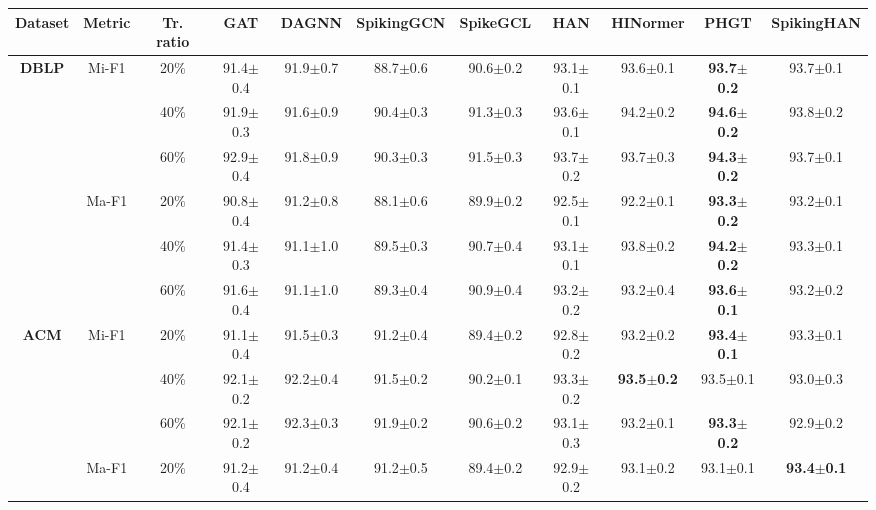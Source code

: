 \documentclass[letterpaper]{article} %
\begin{document}
\begin{table}[t]
\centering
\small
\renewcommand{\arraystretch}{1.3}
\setlength{\tabcolsep}{4pt}
\begin{tabular}{c|c|c|ccccccc|c}
\toprule
\textbf{Dataset} & \textbf{Metric} & \textbf{Tr. ratio} & \textbf{GAT} & \textbf{DAGNN} & \textbf{SpikingGCN} & \textbf{SpikeGCL} & \textbf{HAN} & \textbf{HINormer} & \textbf{PHGT} & \textbf{SpikingHAN} \\
\midrule
\multirow{6}{*}{\textbf{DBLP}} 
 & \multirow{3}{*}{Mi-F1} & 20\% & 91.4$\pm$0.4 & 91.9$\pm$0.7 & 88.7$\pm$0.6 & 90.6$\pm$0.2 & 93.1$\pm$0.1 & 93.6$\pm$0.1 & \textbf{93.7$\pm$0.2} & 93.7$\pm$0.1 \\
 &                        & 40\% & 91.9$\pm$0.3 & 91.6$\pm$0.9 & 90.4$\pm$0.3 & 91.3$\pm$0.3 & 93.6$\pm$0.1 & 94.2$\pm$0.2 & \textbf{94.6$\pm$0.2} & 93.8$\pm$0.2 \\
 &                        & 60\% & 92.9$\pm$0.4 & 91.8$\pm$0.9 & 90.3$\pm$0.3 & 91.5$\pm$0.3 & 93.7$\pm$0.2 & 93.7$\pm$0.3 & \textbf{94.3$\pm$0.2} & 93.7$\pm$0.1 \\
 \cmidrule{2-11}
 & \multirow{3}{*}{Ma-F1} & 20\% & 90.8$\pm$0.4 & 91.2$\pm$0.8 & 88.1$\pm$0.6 & 89.9$\pm$0.2 & 92.5$\pm$0.1 & 92.2$\pm$0.1 & \textbf{93.3$\pm$0.2} & 93.2$\pm$0.1 \\
 &                        & 40\% & 91.4$\pm$0.3 & 91.1$\pm$1.0 & 89.5$\pm$0.3 & 90.7$\pm$0.4 & 93.1$\pm$0.1 & 93.8$\pm$0.2 & \textbf{94.2$\pm$0.2} & 93.3$\pm$0.1 \\
 &                        & 60\% & 91.6$\pm$0.4 & 91.1$\pm$1.0 & 89.3$\pm$0.4 & 90.9$\pm$0.4 & 93.2$\pm$0.2 & 93.2$\pm$0.4 & \textbf{93.6$\pm$0.1} & 93.2$\pm$0.2 \\
\midrule
\multirow{6}{*}{\textbf{ACM}} 
 & \multirow{3}{*}{Mi-F1} & 20\% & 91.1$\pm$0.4 & 91.5$\pm$0.3 & 91.2$\pm$0.4 & 89.4$\pm$0.2 & 92.8$\pm$0.2 & 93.2$\pm$0.2 & \textbf{93.4$\pm$0.1} & 93.3$\pm$0.1 \\
 &                        & 40\% & 92.1$\pm$0.2 & 92.2$\pm$0.4 & 91.5$\pm$0.2 & 90.2$\pm$0.1 & 93.3$\pm$0.2 & \textbf{93.5$\pm$0.2} & 93.5$\pm$0.1 & 93.0$\pm$0.3 \\
 &                        & 60\% & 92.1$\pm$0.2 & 92.3$\pm$0.3 & 91.9$\pm$0.2 & 90.6$\pm$0.2 & 93.1$\pm$0.3 & 93.2$\pm$0.1 & \textbf{93.3$\pm$0.2} & 92.9$\pm$0.2 \\
 \cmidrule{2-11}
 & \multirow{3}{*}{Ma-F1} & 20\% & 91.2$\pm$0.4 & 91.2$\pm$0.4 & 91.2$\pm$0.5 & 89.4$\pm$0.2 & 92.9$\pm$0.2 & 93.1$\pm$0.2 & 93.1$\pm$0.1 & \textbf{93.4$\pm$0.1} \\

\end{tabular}
\end{table}
\end{document}
